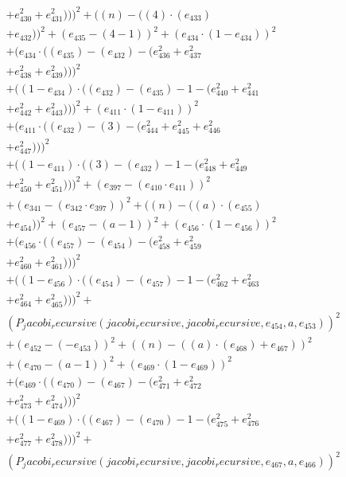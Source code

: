 \documentclass[10pt, a4paper]{article}
\begin{document}
\begin{small}
\begin{align*}
& + e_{430}^{2} + e_{431}^{2})))^{2} + ((n) - ((4)  \cdot  (e_{433}) \\
& + e_{432}))^{2} + (e_{435} - (4 - 1))^{2} + (e_{434}  \cdot  (1 - e_{434}))^{2} \\
& + (e_{434}  \cdot  ((e_{435}) - (e_{432}) - (e_{436}^{2} + e_{437}^{2} \\
& + e_{438}^{2} + e_{439}^{2})))^{2} \\
& + ((1 - e_{434})  \cdot  ((e_{432}) - (e_{435}) - 1 - (e_{440}^{2} + e_{441}^{2} \\
& + e_{442}^{2} + e_{443}^{2})))^{2} + (e_{411}  \cdot  (1 - e_{411}))^{2} \\
& + (e_{411}  \cdot  ((e_{432}) - (3) - (e_{444}^{2} + e_{445}^{2} + e_{446}^{2} \\
& + e_{447}^{2})))^{2} \\
& + ((1 - e_{411})  \cdot  ((3) - (e_{432}) - 1 - (e_{448}^{2} + e_{449}^{2} \\
& + e_{450}^{2} + e_{451}^{2})))^{2} + (e_{397} - (e_{410}  \cdot  e_{411}))^{2} \\
& + (e_{341} - (e_{342}  \cdot  e_{397}))^{2} + ((n) - ((a)  \cdot  (e_{455}) \\
& + e_{454}))^{2} + (e_{457} - (a - 1))^{2} + (e_{456}  \cdot  (1 - e_{456}))^{2} \\
& + (e_{456}  \cdot  ((e_{457}) - (e_{454}) - (e_{458}^{2} + e_{459}^{2} \\
& + e_{460}^{2} + e_{461}^{2})))^{2} \\
& + ((1 - e_{456})  \cdot  ((e_{454}) - (e_{457}) - 1 - (e_{462}^{2} + e_{463}^{2} \\
& + e_{464}^{2} + e_{465}^{2})))^{2} + \\
& (P_jacobi_recursive(jacobi_recursive, jacobi_recursive, e_{454}, a, e_{453}))^{2} \\
& + (e_{452} - (-e_{453}))^{2} + ((n) - ((a)  \cdot  (e_{468}) + e_{467}))^{2} \\
& + (e_{470} - (a - 1))^{2} + (e_{469}  \cdot  (1 - e_{469}))^{2} \\
& + (e_{469}  \cdot  ((e_{470}) - (e_{467}) - (e_{471}^{2} + e_{472}^{2} \\
& + e_{473}^{2} + e_{474}^{2})))^{2} \\
& + ((1 - e_{469})  \cdot  ((e_{467}) - (e_{470}) - 1 - (e_{475}^{2} + e_{476}^{2} \\
& + e_{477}^{2} + e_{478}^{2})))^{2} + \\
& (P_jacobi_recursive(jacobi_recursive, jacobi_recursive, e_{467}, a, e_{466}))^{2} \\

\end{align*}
\end{small}
\end{document}

